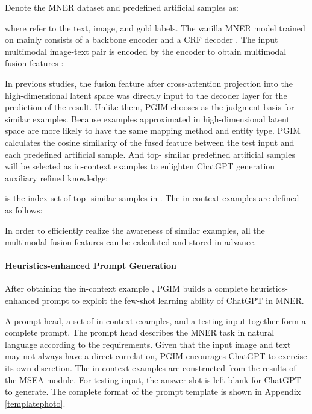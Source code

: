 \documentclass[11pt]{article}
\begin{document}
Denote the MNER dataset  and predefined artificial samples  as:
\vspace{-3pt}


where  refer to the text, image, and gold labels. The vanilla MNER model  trained on  mainly consists of a backbone encoder  and a CRF decoder . The input multimodal image-text pair is encoded by the encoder  to obtain multimodal fusion features :
\vspace{-3pt}


In previous studies, the fusion feature  after cross-attention projection into the high-dimensional latent space was directly input to the decoder layer for the prediction of the result. 
Unlike them, PGIM chooses  as the judgment basis for similar examples. 
Because examples approximated in high-dimensional latent space are more likely to have the same mapping method and entity type. 
PGIM calculates the cosine similarity of the fused feature  between the test input and each predefined artificial sample. And top- similar predefined artificial samples will be selected as in-context examples to enlighten ChatGPT generation auxiliary refined knowledge: 
\vspace{-3pt}

 is the index set of top- similar samples in . The in-context examples  are defined as follows: 
\vspace{-3pt}


In order to efficiently realize the awareness of similar examples, all the multimodal fusion features can be calculated and stored in advance.

\paragraph{Heuristics-enhanced Prompt Generation}
After obtaining the in-context example , PGIM builds a complete heuristics-enhanced prompt to exploit the few-shot learning ability of ChatGPT in MNER. 

A prompt head, a set of in-context examples, and a testing input together form a complete prompt. The prompt head describes the MNER task in natural language according to the requirements. 
Given that the input image and text may not always have a direct correlation, PGIM encourages ChatGPT to exercise its own discretion. 
The in-context examples are constructed from the results  of the MSEA module. For testing input, the answer slot is left blank for ChatGPT to generate.
The complete format of the prompt template is shown in Appendix \ref{templatephoto}. 
\end{document}
